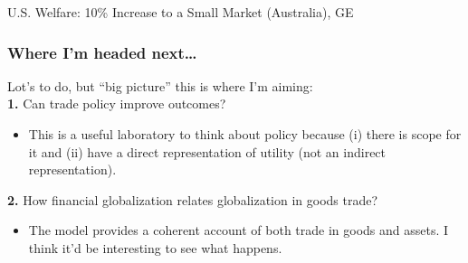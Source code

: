 \documentclass[9pt,pdftex,aspectratio=1610]{beamer}
\theoremstyle{definition}
\begin{document}
\begin{frame}[t]{U.S. Welfare: 10\% {\color{red} Increase} to a Small Market (Australia), {\color{red} GE} }
\vspace{-.5cm}
\begin{figure}[!t]
\end{figure}
\end{frame}



\begin{frame}[t]
\frametitle{Where I'm headed next\ldots}
\smallskip
Lot's to do, but ``big picture'' this is where I'm aiming:\\
\bigskip
\textbf{1.} Can trade policy improve outcomes?
\begin{itemize}
\smallskip
\item This is a useful laboratory to think about policy because (i) there is scope for it and (ii) have a direct representation of utility (not an indirect representation).
\end{itemize}
\bigskip
\textbf{2.} How financial globalization relates globalization in goods trade?
\begin{itemize}
\smallskip
\item The model provides a coherent account of both trade in goods and assets. I think it'd be interesting to see what happens.
\end{itemize}
\end{frame}
\end{document}
